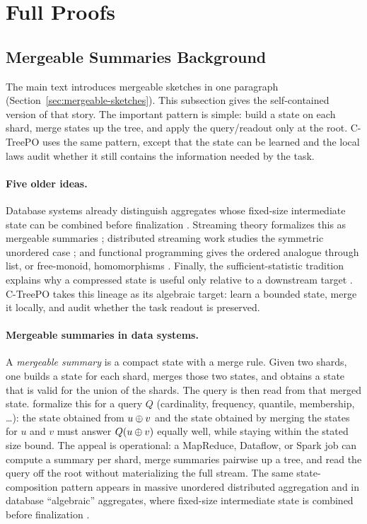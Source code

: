 \section{Full Proofs}\label{app:proofs}

\subsection{Mergeable Summaries Background}\label{app:mergeable-background}

The main text introduces mergeable sketches in one paragraph
(Section~\ref{sec:mergeable-sketches}). This subsection gives the
self-contained version of that story. The important pattern is simple:
build a state on each shard, merge states up the tree, and apply the
query/readout only at the root. C-TreePO uses the same pattern, except
that the state can be learned and the local laws audit whether it still
contains the information needed by the task.

\paragraph{Five older ideas.}
Database systems already distinguish aggregates whose fixed-size
intermediate state can be combined before finalization
\citep{GrayEtAl1997DataCube}. Streaming theory formalizes this as
mergeable summaries \citep{Agarwal2013MergeableTODS}; distributed
streaming work studies the symmetric unordered case
\citep{FeldmanEtAl2008MUD}; and functional programming gives the
ordered analogue through list, or free-monoid, homomorphisms
\citep{Gibbons1996ThirdHomomorphism}. Finally, the
sufficient-statistic tradition explains why a compressed state is
useful only relative to a downstream target
\citep{Fisher1922,Blackwell1953}. C-TreePO takes this lineage as its
algebraic target: learn a bounded state, merge it locally, and audit
whether the task readout is preserved.

\paragraph{Mergeable summaries in data systems.}
A \emph{mergeable summary} is a compact state with a merge rule. Given
two shards, one builds a state for each shard, merges those two states,
and obtains a state that is valid for the union of the shards. The
query is then read from that merged state. \citet{Agarwal2013MergeableTODS}
formalize this for a query $Q$ (cardinality, frequency, quantile,
membership, \dots): the state obtained from $u\oplus v$ and the state
obtained by merging the states for $u$ and $v$ must answer
$Q(u\oplus v)$ equally well, while staying within the stated size
bound. The appeal is operational: a MapReduce, Dataflow, or Spark job
can compute a summary per shard, merge summaries pairwise up a tree,
and read the query off the root without materializing the full stream.
The same state-composition pattern appears in massive unordered
distributed aggregation and in database ``algebraic'' aggregates,
where fixed-size intermediate state is combined before finalization
\citep{FeldmanEtAl2008MUD,GrayEtAl1997DataCube}.

